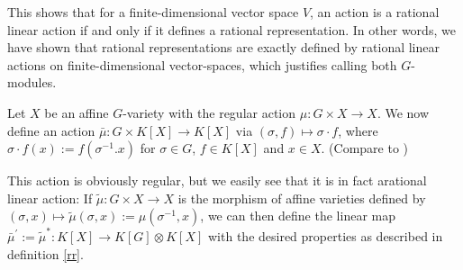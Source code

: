 
\begin{remark}
  This shows that for a finite-dimensional vector space $V$, an action is a rational linear action if and only if it defines a rational representation.
  In other words, we have shown that rational representations are exactly defined by rational linear actions on finite-dimensional vector-spaces, which justifies calling both $G$-modules.
\end{remark}

\begin{definition}\label{funrep}
  Let $X$ be an affine $G$-variety with the regular action \linebreak $\mu \colon G \times X \rightarrow X$.
  We now define an action $\bar{\mu} \colon G \times K[X] \rightarrow K[X]$ via \linebreak$(\sigma,f) \mapsto \sigma \cdot f$, where $\sigma\cdot f (x) := f( \sigma^{-1}.x )$ for  $\sigma \in G$, $f \in K[X]$ and $x \in X$.  (Compare to \cite[p.~31]{DK15})
  
  This action is obviously regular, but we easily see that it is in fact a\linebreak rational linear action:
  If $\tilde{\mu} \colon G \times X \rightarrow X$ is the morphism of affine varieties defined by $ (\sigma,x)\mapsto\tilde{\mu} (\sigma,x) := \mu (\sigma^{-1},x)$, we can then define the linear map \linebreak$ \bar{\mu}^\prime := \tilde{\mu}^\ast \colon K[X] \rightarrow K[G] \otimes K[X]$ with the desired properties as described in definition \ref{rr}.
\end{definition}

